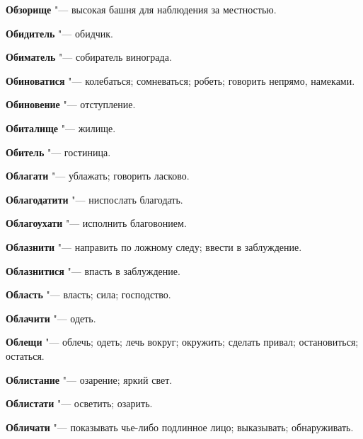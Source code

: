 \begin{mymulticols}{2}
\noindent\textbf{Обзорище} "--- высокая башня для наблюдения за местностью. 




\noindent\textbf{Обидитель} "--- обидчик. 




\noindent\textbf{Обиматель} "--- собиратель винограда. 




\noindent\textbf{Обиноватися} "--- колебаться; сомневаться; робеть; говорить непрямо, намеками. 




\noindent\textbf{Обиновение} "--- отступление. 




\noindent\textbf{Обиталище} "--- жилище. 




\noindent\textbf{Обитель} "--- гостиница. 




\noindent\textbf{Облагати} "--- ублажать; говорить ласково. 




\noindent\textbf{Облагодатити} "--- ниспослать благодать. 




\noindent\textbf{Облагоухати} "--- исполнить благовонием. 




\noindent\textbf{Облазнити} "--- направить по ложному следу; ввести в заблуждение. 




\noindent\textbf{Облазнитися} "--- впасть в заблуждение. 




\noindent\textbf{Область} "--- власть; сила; господство. 




\noindent\textbf{Облачити} "--- одеть. 




\noindent\textbf{Облещи} "--- облечь; одеть; лечь вокруг; окружить; сделать привал; остановиться; остаться. 




\noindent\textbf{Облистание} "--- озарение; яркий свет. 




\noindent\textbf{Облистати} "--- осветить; озарить. 




\noindent\textbf{Обличати} "--- показывать чье-либо подлинное лицо; выказывать; обнаруживать. 





\end{mymulticols}
